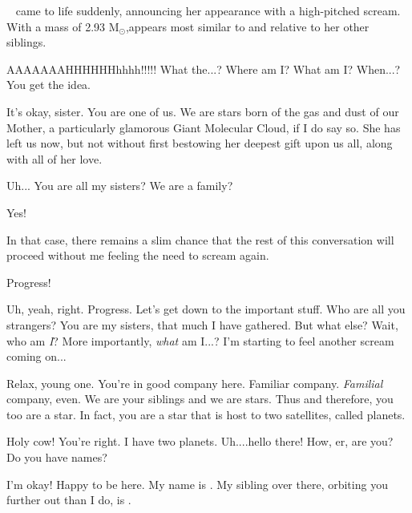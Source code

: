 \documentclass[main.tex]{subfiles}
\begin{document}
\par \nar \rmsterope~ came to life suddenly, announcing her appearance with a high-pitched scream.  With a mass of 2.93 M$_{\odot}$,\rmsterope appears most similar to \rmtaygete and \rmalcyone relative to her other siblings.

\par \Sterope AAAAAAAHHHHHHhhhh!!!!!  What the...?  Where am I?  What am I?  When...?  You get the idea.

\par \Maia It's okay, sister.  You are one of us.  We are stars born of the gas and dust of our Mother, a particularly glamorous Giant Molecular Cloud, if I do say so.  She has left us now, but not without first bestowing her deepest gift upon us all, along with all of her love.

\par \Sterope  Uh... You are all my sisters?  We are a family?

\par \Maia Yes!

\par \Sterope  In that case, there remains a slim chance that the rest of this conversation will proceed without me feeling the need to scream again.

\par \Maia Progress!

\par \Sterope Uh, yeah, right.  Progress.  Let's get down to the important stuff.  Who are all you strangers?  You are my sisters, that much I have gathered.  But what else?  Wait, who am \textit{I}?  More importantly, \textit{what} am I...?  I'm starting to feel another scream coming on...

\par \Maia Relax, young one.  You're in good company here.  Familiar company.  \textit{Familial} company, even. We are your siblings and we are stars.  Thus and therefore, you too are a star.  In fact, you are a star that is host to two satellites, called planets. 

\par \Sterope Holy cow!  You're right.  I have two planets.  Uh....hello there!  How, er, are you?  Do you have names?

\par \Alphab I'm okay!  Happy to be here.  My name is \rmalpha.  My sibling over there, orbiting you further out than I do, is \rmbeta.
\end{document}
